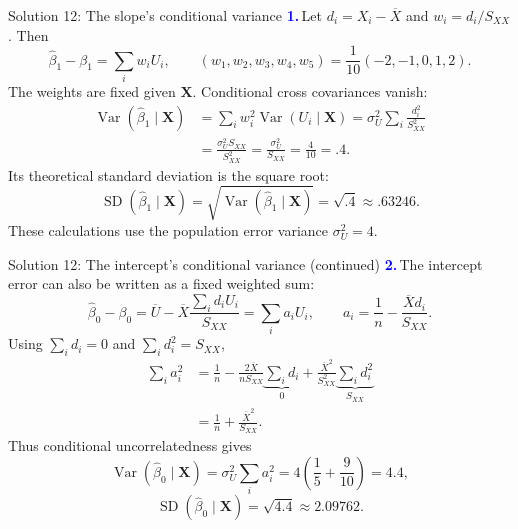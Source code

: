 \documentclass[notes,10pt, aspectratio=169]{beamer}
\newif\ifshowsolutions
\newcommand{\Var}{\operatorname{Var}}
\newcommand{\answerpart}[1]{\textcolor{blue}{\textbf{#1.}}\,}
\begin{document}
\ifshowsolutions
\begin{frame}{Solution 12: The slope's conditional variance}
\small
\answerpart{1}Let $d_i=X_i-\overline X$ and $w_i=d_i/S_{XX}$. Then
\[
\widehat\beta_1-\beta_1=\sum_iw_iU_i,
\qquad (w_1,w_2,w_3,w_4,w_5)=\frac1{10}(-2,-1,0,1,2).
\]
The weights are fixed given $\mathbf X$. Conditional cross covariances vanish:
\begin{align*}
\Var(\widehat\beta_1\mid\mathbf X)
&=\sum_iw_i^2\Var(U_i\mid\mathbf X)
=\sigma_U^2\sum_i\frac{d_i^2}{S_{XX}^2}\\
&=\frac{\sigma_U^2S_{XX}}{S_{XX}^2}
=\frac{\sigma_U^2}{S_{XX}}=\frac4{10}=\boxed{.4}.
\end{align*}
Its theoretical standard deviation is the square root:
\[
\operatorname{SD}(\widehat\beta_1\mid\mathbf X)
=\sqrt{\Var(\widehat\beta_1\mid\mathbf X)}
=\sqrt{.4}\approx\boxed{.63246}.
\]
These calculations use the population error variance $\sigma_U^2=4$.
\end{frame}

\begin{frame}{Solution 12: The intercept's conditional variance (continued)}
\small
\answerpart{2}The intercept error can also be written as a fixed weighted sum:
\[
\widehat\beta_0-\beta_0
=\overline U-\overline X\frac{\sum_id_iU_i}{S_{XX}}
=\sum_i a_iU_i,
\qquad a_i=\frac1n-\frac{\overline Xd_i}{S_{XX}}.
\]
Using $\sum_i d_i=0$ and $\sum_i d_i^2=S_{XX}$,
\begin{align*}
\sum_i a_i^2
&=\frac1n-\frac{2\overline X}{nS_{XX}}\underbrace{\sum_id_i}_{0}
+\frac{\overline X^2}{S_{XX}^2}\underbrace{\sum_id_i^2}_{S_{XX}}\\
&=\frac1n+\frac{\overline X^2}{S_{XX}}.
\end{align*}
Thus conditional uncorrelatedness gives
\[
\Var(\widehat\beta_0\mid\mathbf X)
=\sigma_U^2\sum_i a_i^2
=4\left(\frac15+\frac9{10}\right)=\boxed{4.4},
\]
\[
\operatorname{SD}(\widehat\beta_0\mid\mathbf X)=\sqrt{4.4}\approx\boxed{2.09762}.
\]
\end{frame}
\end{document}
